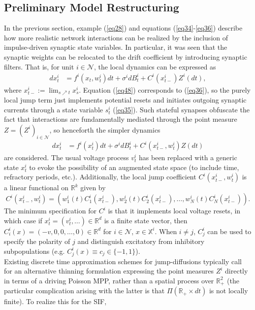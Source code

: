 \documentclass[12pt, oneside]{report}
\newcommand{\mbb}[1]{\mathbb{#1}}
\newcommand{\1}[1]{\mathbbm{1}_{\{#1\}}}
\newcommand{\mc}[1]{\mathcal{#1}}
\theoremstyle{definition}
\begin{document}
\subsection{Preliminary Model Restructuring}\label{subsec2}
In the previous section, example (\ref{eq28}) and equations
(\ref{eq34}-\ref{eq36}) describe how more realistic network interactions can be
realized by the inclusion of impulse-driven synaptic state variables. In
particular, it was seen that the synaptic weights can be relocated to the drift
coefficient by introducing synaptic filters. That is, for unit $i\in\mc{N}$, the
local dynamics can be expressed as
\begin{align}
    dx^i_t&=f^i(x_t,w^i_t)dt+\sigma^idB^i_t+C^i(x^i_{t-})Z^i(dt),\label{eq48}
\end{align}
where $x^i_{t-}:=\lim_{s\nearrow t}x^i_s$. Equation (\ref{eq48}) corresponds to
(\ref{eq36}), so the purely local jump term just implements potential resets and
initiates outgoing synaptic currents through a state variable $s^i_t$
(\ref{eq35}). Such stateful synapses obfuscate the fact that interactions are
fundamentally mediated through the point measure $Z=(Z^i)_{i\in\mc{N}}$, so
henceforth the simpler dynamics
\begin{align}
    dx^i_t&=f^i(x^i_t)dt+\sigma^idB^i_t+C^i(x^i_{t-},w^i_t)Z(dt)\label{eq49}
\end{align}
are considered. The usual voltage process $v^i_t$ has been replaced with a
generic state $x^i_t$ to evoke the possibility of an augmented state space (to
include time, refractory periods, etc.). Additionally, the local jump
coefficient $C^i(x^i_{t-},w^i_t)$ is a linear functional on $\mbb{R}^k$ given by 
\[C^i(x^i_{t-},w^i_t)=(w^i_1(t)C^i_1(x^i_{t-}),w^i_2(t)C^i_2(x^i_{t-}),\dots,w^i_N(t)C^i_N(x^i_{t-})).\]
The minimum specification for $C^i$ is that it implements local voltage resets,
in which case if $x^i_t=(v^i_t,\dots)\in\mbb{R}^d$ is a finite state vector, then
$C^i_i(x)=(-v,0,0,\dots, 0)\in\mbb{R}^d$ for $i\in\mc{N}$, $x\in\mbb{X}^i$. When
$i\neq j$, $C^i_j$ can be used to specify the polarity of $j$ and distinguish
excitatory from inhibitory subpopulations (e.g. $C^i_j(x)\equiv
c_j\in\{-1,1\}$).\\[5pt]
\indent Existing discrete time approximation schemes for jump-diffusions typically
call for an alternative thinning formulation expressing the point measures $Z^i$
directly in terms of a driving Poisson MPP, rather than a spatial process over
$\mbb{R}_+^2$ (the particular complication arising with the latter is that
$\Pi(\mbb{R}_+\times dt)$ is not locally finite). To realize this for the SIF,
\end{document}
